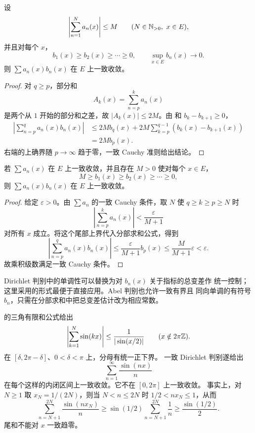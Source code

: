 \begin{theorem}[一致 Dirichlet 判别]
\label{thm:uniform-dirichlet-test}
设
\[
 \left|\sum_{n=1}^Na_n(x)\right|\le M
 \qquad(N\in\mathbb{N}_{>0},\ x\in E),
\]
并且对每个 \(x\)，
\[
 b_1(x)\ge b_2(x)\ge\cdots\ge0,
\qquad
 \sup_{x\in E}b_n(x)\to0.
\]
则 \(\sum a_n(x)b_n(x)\) 在 \(E\) 上一致收敛。
\end{theorem}

\begin{proof}
对 \(q\ge p\)，部分和
\[
 A_k(x)=\sum_{n=p}^ka_n(x)
\]
是两个从 \(1\) 开始的部分和之差，故 \(|A_k(x)|\le2M\)。由
 和 \(b_k-b_{k+1}\ge0\)，
\[
\begin{aligned}
 \left|\sum_{n=p}^qa_n(x)b_n(x)\right|
 &\le2M b_q(x)+2M\sum_{k=p}^{q-1}(b_k(x)-b_{k+1}(x))\\
 &=2M b_p(x).
\end{aligned}
\]
右端的上确界随 \(p\to\infty\) 趋于零，一致 Cauchy 准则给出结论。
\end{proof}

\begin{theorem}[一致 Abel 判别]
\label{thm:uniform-abel-test}
若 \(\sum a_n(x)\) 在 \(E\) 上一致收敛，并且存在 \(M>0\) 使对每个
\(x\in E\)，
\[
 M\ge b_1(x)\ge b_2(x)\ge\cdots\ge0,
\]
则 \(\sum a_n(x)b_n(x)\) 在 \(E\) 上一致收敛。
\end{theorem}

\begin{proof}
给定 \(\varepsilon>0\)。由 \(\sum a_n\) 的一致 Cauchy 条件，取 \(N\)
使 \(q\ge k\ge p\ge N\) 时
\[
 \left|\sum_{n=p}^ka_n(x)\right|<\frac{\varepsilon}{M+1}
\]
对所有 \(x\) 成立。将这个尾部上界代入分部求和公式，得到
\[
 \left|\sum_{n=p}^qa_n(x)b_n(x)\right|
 \le\frac{\varepsilon}{M+1}b_p(x)
 \le\frac{M}{M+1}\varepsilon<\varepsilon.
\]
故乘积级数满足一致 Cauchy 条件。
\end{proof}

Dirichlet 判别中的单调性可以替换为对 \(b_n(x)\) 关于指标的总变差作
统一控制；这里采用的形式最便于直接应用。Abel 判别也允许一致有界且
同向单调的有符号 \(b_n\)，只需在分部求和中把总变差估计改为相应常数。

\begin{example}[三角级数的内闭一致收敛]
 的三角有限和公式给出
\[
 \left|\sum_{k=1}^N\sin(kx)\right|
 \le\frac{1}{|\sin(x/2)|}\qquad(x\notin2\pi\mathbb{Z}).
\]
在 \([\delta,2\pi-\delta]\)、\(0<\delta<\pi\) 上，分母有统一正下界。
一致 Dirichlet 判别遂给出
\[
 \sum_{n=1}^\infty\frac{\sin(nx)}n
\]
在每个这样的内闭区间上一致收敛。它不在 \([0,2\pi]\) 上一致收敛。
事实上，对 \(N\ge1\) 取 \(x_N=1/(2N)\)，则当
\(N<n\le2N\) 时 \(1/2<nx_N\le1\)，从而
\[
 \sum_{n=N+1}^{2N}\frac{\sin(nx_N)}n
 \ge \sin(1/2)\sum_{n=N+1}^{2N}\frac1n
 \ge \frac{\sin(1/2)}2.
\]
尾和不能对 \(x\) 一致趋零。
\end{example}

